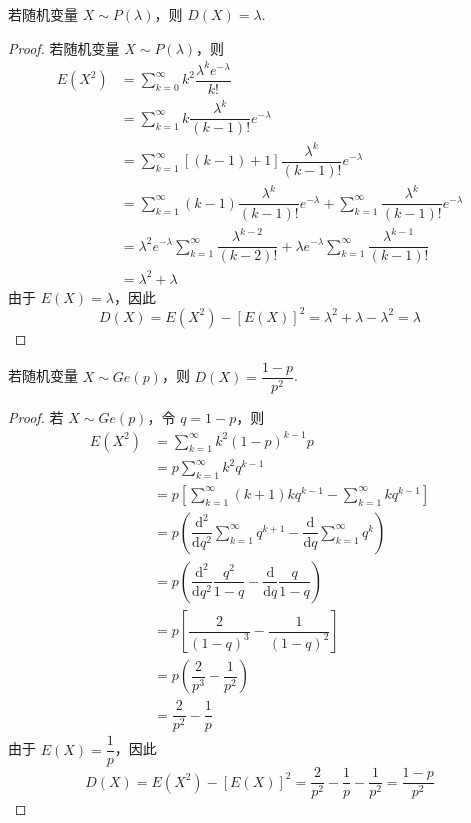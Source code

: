 \begin{conclusion}
    \indent 若随机变量 $X \sim P(\lambda)$，则 $D(X) = \lambda$.
\end{conclusion}

\begin{proof}
    若随机变量 $X \sim P(\lambda)$，则
    $$
    \begin{aligned}
        E(X^2) &= \sum_{k=0}^{\infty} k^2 \dfrac{\lambda^k e^{-\lambda}}{k!} \\
        &= \sum_{k=1}^{\infty} k \dfrac{\lambda^{k}}{(k-1)!} e^{-\lambda} \\
        &= \sum_{k=1}^{\infty} [(k-1)+1] \dfrac{\lambda^{k}}{(k-1)!} e^{-\lambda} \\
        &= \sum_{k=1}^{\infty} (k-1) \dfrac{\lambda^{k}}{(k-1)!} e^{-\lambda} + \sum_{k=1}^{\infty} \dfrac{\lambda^{k}}{(k-1)!} e^{-\lambda} \\
        &= \lambda^2 e^{-\lambda} \sum_{k=1}^{\infty} \dfrac{\lambda^{k-2}}{(k-2)!} + \lambda e^{-\lambda} \sum_{k=1}^{\infty} \dfrac{\lambda^{k-1}}{(k-1)!} \\
        &= \lambda^2 + \lambda
    \end{aligned}
    $$
    由于 $E(X) = \lambda$，因此
    $$
    D(X) = E(X^2) - [E(X)]^2 = \lambda^2 + \lambda - \lambda^2 = \lambda
    $$
\end{proof}

\begin{conclusion}
    \indent 若随机变量 $X \sim Ge(p)$，则 $D(X) = \dfrac{1-p}{p^2}$.
\end{conclusion}

\begin{proof}
    若 $X \sim Ge(p)$，令 $q=1-p$，则
    $$
    \begin{aligned}
        E(X^2) &= \sum_{k=1}^{\infty} k^2 (1-p)^{k-1} p \\
        &= p \sum_{k=1}^{\infty} k^2 q^{k-1} \\
        &= p \left[ \sum_{k=1}^{\infty} (k+1)k q^{k-1} - \sum_{k=1}^{\infty} k q^{k-1} \right] \\
        &= p \left( \dfrac{\text{d}^2}{\text{d}q^2} \sum_{k=1}^{\infty} q^{k+1} - \dfrac{\text{d}}{\text{d}q} \sum_{k=1}^{\infty} q^k \right) \\
        &= p \left( \dfrac{\text{d}^2}{\text{d}q^2} \dfrac{q^2}{1-q} - \dfrac{\text{d}}{\text{d}q} \dfrac{q}{1-q} \right) \\
        &= p \left[ \dfrac{2}{(1-q)^3} - \dfrac{1}{(1-q)^2} \right] \\
        &= p \left( \dfrac{2}{p^3} - \dfrac{1}{p^2} \right) \\
        &= \dfrac{2}{p^2} - \dfrac{1}{p}
    \end{aligned}
    $$
    由于 $E(X) = \dfrac{1}{p}$，因此
    $$
    D(X) = E(X^2) - [E(X)]^2 = \dfrac{2}{p^2} - \dfrac{1}{p} - \dfrac{1}{p^2} = \dfrac{1-p}{p^2}
    $$
\end{proof}

